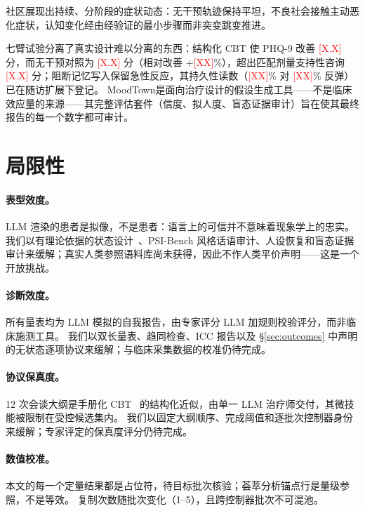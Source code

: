 \documentclass[11pt,a4paper]{article}
\newcommand{\ph}[1]{\textcolor{red}{[#1]}}
\newcommand{\sys}{MoodTown}
\begin{document}
社区展现出持续、分阶段的症状动态：无干预轨迹保持平坦，不良社会接触主动恶化症状，认知变化经由经验证的最小步骤而非突变跳变推进。

七臂试验分离了真实设计难以分离的东西：结构化 CBT 使 PHQ-9 改善 \ph{X.X} 分，而无干预对照为 \ph{X.X} 分（相对改善 +\ph{XX}\%），超出匹配剂量支持性咨询 \ph{X.X} 分；阻断记忆写入保留急性反应，其持久性读数（\ph{XX}\% 对 \ph{XX}\% 反弹）已在随访扩展下登记。
\sys 是面向治疗设计的假设生成工具——不是临床效应量的来源——其完整评估套件（信度、拟人度、盲态证据审计）旨在使其最终报告的每一个数字都可审计。

\section*{局限性}\label{sec:limitations}

\paragraph{表型效度。}
LLM 渲染的患者是拟像，不是患者：语言上的可信并不意味着现象学上的忠实。
我们以有理论依据的状态设计~\citep{patientact2026}、PSI-Bench 风格话语审计、人设恢复和盲态证据审计来缓解；真实人类参照语料库尚未获得，因此不作人类平价声明——这是一个开放挑战。

\paragraph{诊断效度。}
所有量表均为 LLM 模拟的自我报告，由专家评分 LLM 加规则校验评分，而非临床施测工具。
我们以双长量表、趋同检查、ICC 报告以及 \S\ref{sec:outcomes} 中声明的无状态逐项协议来缓解；与临床采集数据的校准仍待完成。

\paragraph{协议保真度。}
12 次会谈大纲是手册化 CBT~\citep{beck1979} 的结构化近似，由单一 LLM 治疗师交付，其微技能被限制在受控候选集内。
我们以固定大纲顺序、完成阈值和逐批次控制器身份来缓解；专家评定的保真度评分仍待完成。

\paragraph{数值校准。}
本文的每一个定量结果都是占位符，待目标批次核验；荟萃分析锚点行是量级参照，不是等效。
复制次数随批次变化（1--5），且跨控制器批次不可混池。
\end{document}
